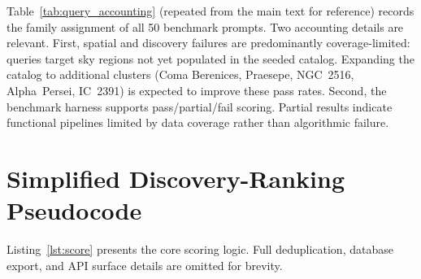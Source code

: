\documentclass[12pt]{elsarticle}
\begin{document}
Table~\ref{tab:query_accounting} (repeated from the main text for reference) records the family assignment of all 50 benchmark prompts. Two accounting details are relevant. First, spatial and discovery failures are predominantly coverage-limited: queries target sky regions not yet populated in the seeded catalog. Expanding the catalog to additional clusters (Coma Berenices, Praesepe, NGC~2516, Alpha~Persei, IC~2391) is expected to improve these pass rates. Second, the benchmark harness supports pass/partial/fail scoring. Partial results indicate functional pipelines limited by data coverage rather than algorithmic failure.

\section{Simplified Discovery-Ranking Pseudocode}
\label{app:scoring}

Listing~\ref{lst:score} presents the core scoring logic. Full deduplication, database export, and API surface details are omitted for brevity.
\end{document}
